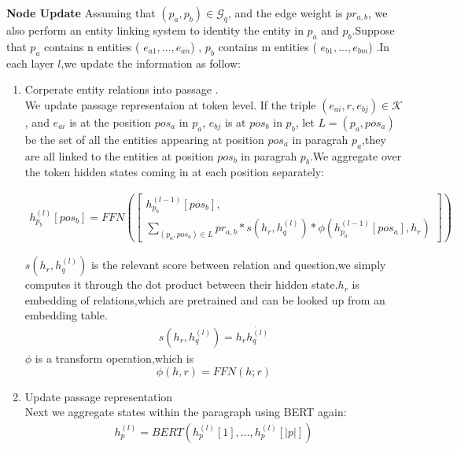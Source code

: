 \documentclass[sigconf]{acmart}
\begin{document}
	\textbf{Node Update}		
	Assuming that $(p_a,p_b) \in \mathcal{G}_q$, and the edge weight is $pr_{a,b}$, we also perform an entity linking system\cite{ferragina2011fast} to identity the  entity in $p_a$ and $p_b$.Suppose that		
	$p_a$ contains n entities ( $e_{a1},...,e_{an}$) ,		
	$p_b$ contains m entities ( $e_{b1},...,e_{bm}$) .In each layer $l$,we update the information as follow:
	\begin{enumerate}[(1)]
		\item Corperate entity relations into passage .\\	
		We update passage representaion at token level.	
		If the triple $(e_{ai},r,e_{bj}) \in \mathcal{K}$, and $e_{ai}$ is at the position $pos_a$ in $p_a$, $e_{bj}$ is at  $pos_b$  in $p_b$,		
		let $L=(p_a,pos_a)$ be the set of all the entities appearing at position $pos_a$ in paragrah $p_a$,they are all linked to the entities at position $pos_b$ in paragrah $p_b$.We aggregate over the token hidden states coming in at
		each position separately: 
		
		\begin{displaymath}
			\begin{aligned}
				h^{(l)}_{p_b}[pos_b] = FFN
				\left(					 
				\begin{bmatrix}  
					h^{(l-1)}_{p_b}[pos_b],\\ 		
					\sum\limits_{(p_a,pos_a) \in L}
					pr_{a,b}*
					s(h_r,h_q^{(l)})*
					\phi(h^{(l-1)}_{p_a}[pos_a],h_r)
				\end{bmatrix} 
				\right)								
			\end{aligned}
		\end{displaymath}
		
		$s(h_r,h_q^{(l)})$ is the relevant score between relation and question,we simply computes it through the dot product between their hidden state.$h_r$ is embedding of  relations,which are pretrained and can be looked up from an embedding table.
		\begin{displaymath}
			\begin{aligned}
				s(h_r,h_q^{(l)}) = h_r\dot{h_q^{(l)}}
			\end{aligned}
		\end{displaymath}
		$\phi$ is a transform operation,which is 
		\begin{displaymath}
			\phi(h,r) = FFN(h;r)
		\end{displaymath}
		
		\item Update passage representation\\
		Next we aggregate states within the paragraph using BERT again:
		\begin{displaymath}
			\begin{aligned}
				h_{p}^{(l)} = BERT(h_p^{(l)}[1],...,h_p^{(l)}[|p|])
			\end{aligned}
		\end{displaymath}
		

\end{enumerate}
\end{document}
